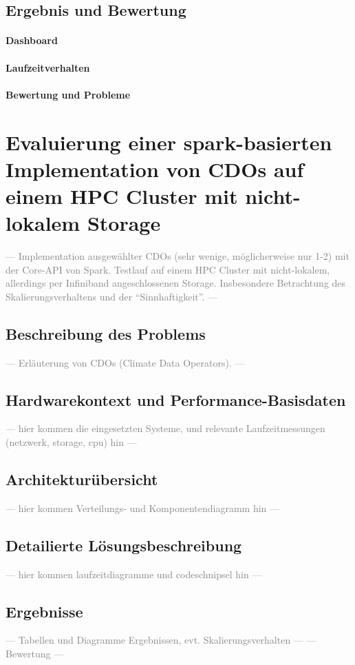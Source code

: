 \subsection{Ergebnis und Bewertung}
\paragraph{Dashboard}
\paragraph{Laufzeitverhalten}
\paragraph{Bewertung und Probleme}

\section{Evaluierung einer spark-basierten Implementation von CDOs auf einem HPC Cluster mit nicht-lokalem Storage}
\textcolor{gray}{--- Implementation ausgewählter CDOs (sehr wenige, möglicherweise nur 1-2) mit der Core-API von Spark. Testlauf auf einem HPC Cluster mit nicht-lokalem, allerdings per Infiniband angeschlossenen Storage.
Insbesondere Betrachtung des Skalierungsverhaltens und der "`Sinnhaftigkeit"'. ---}

\subsection{Beschreibung des Problems}
\textcolor{gray}{--- Erläuterung von CDOs (Climate Data Operators). ---}
\subsection{Hardwarekontext und Performance-Basisdaten}
\textcolor{gray}{--- hier kommen die eingesetzten Systeme, und relevante Laufzeitmessungen (netzwerk, storage, cpu) hin ---}
\subsection{Architekturübersicht}
\textcolor{gray}{--- hier kommen Verteilungs- und Komponentendiagramm hin ---}
\subsection{Detailierte Lösungsbeschreibung}
\textcolor{gray}{--- hier kommen laufzeitdiagramme und codeschnipsel hin ---}
\subsection{Ergebnisse}
\textcolor{gray}{--- Tabellen und Diagramme Ergebnissen, evt. Skalierungsverhalten ---}
\textcolor{gray}{--- Bewertung ---}

